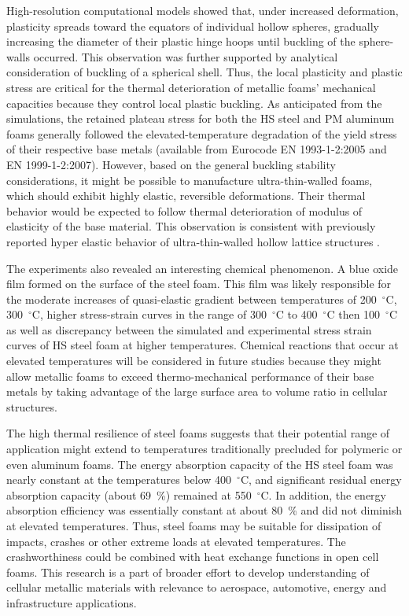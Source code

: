 \documentclass[review]{elsarticle}
\begin{document}
High-resolution computational models showed that, under increased deformation, plasticity spreads toward the equators of individual hollow spheres, gradually increasing the diameter of their plastic hinge hoops until buckling of the sphere-walls occurred. This observation was further supported by analytical consideration of buckling of a spherical shell. Thus, the local plasticity and plastic stress are critical for the thermal deterioration of metallic foams' mechanical capacities because they control local plastic buckling. As anticipated from the simulations, the retained plateau stress for both the HS steel and PM aluminum foams generally followed the elevated-temperature degradation of the yield stress of their respective base metals (available from Eurocode EN 1993-1-2:2005 and EN 1999-1-2:2007). However, based on the general buckling stability considerations, it might be possible to manufacture ultra-thin-walled foams, which should exhibit highly elastic, reversible deformations. Their thermal behavior would be expected to follow thermal deterioration of modulus of elasticity of the base material. This observation is consistent with previously reported hyper elastic behavior of ultra-thin-walled hollow lattice structures \cite{Sch2011}.

The experiments also revealed an interesting chemical phenomenon. A blue oxide film formed on the surface of the steel foam. This film was likely responsible for the moderate increases of quasi-elastic gradient between temperatures of 200~$^{\circ}\mathrm{C}$, 300~$^{\circ}\mathrm{C}$, higher stress-strain curves in the range of 300~$^{\circ}\mathrm{C}$ to 400~$^{\circ}\mathrm{C}$ then 100~$^{\circ}\mathrm{C}$ as well as discrepancy between the simulated and experimental stress strain curves of HS steel foam at higher temperatures.  Chemical reactions that occur at elevated temperatures will be considered in future studies because they might allow metallic foams to exceed thermo-mechanical performance of their base metals by taking advantage of the large surface area to volume ratio in cellular structures.

The high thermal resilience of steel foams suggests that their potential range of application might extend to temperatures traditionally precluded for polymeric or even aluminum foams. The energy absorption capacity of the HS steel foam was nearly constant at the temperatures below 400~$^{\circ}\mathrm{C}$, and significant residual energy absorption capacity (about 69~\%) remained at 550~$^{\circ}\mathrm{C}$. In addition, the energy absorption efficiency was essentially constant at about 80~\% and did not diminish at elevated temperatures. Thus, steel foams may be suitable for dissipation of impacts, crashes or other extreme loads at elevated temperatures. The crashworthiness could be combined with heat exchange functions in open cell foams. This research is a part of broader effort to develop understanding of cellular metallic materials with relevance to aerospace, automotive, energy and infrastructure applications.
\end{document}
